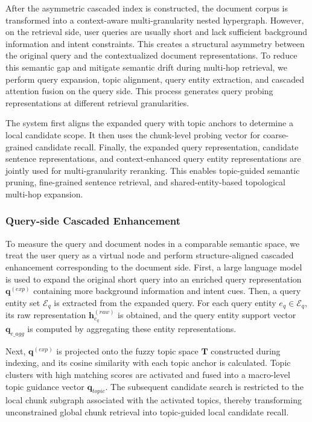\documentclass[preprint,12pt]{elsarticle}
\begin{document}
After the asymmetric cascaded index is constructed, the document corpus is transformed into a context-aware multi-granularity nested hypergraph. However, on the retrieval side, user queries are usually short and lack sufficient background information and intent constraints. This creates a structural asymmetry between the original query and the contextualized document representations. To reduce this semantic gap and mitigate semantic drift during multi-hop retrieval, we perform query expansion, topic alignment, query entity extraction, and cascaded attention fusion on the query side. This process generates query probing representations at different retrieval granularities.

The system first aligns the expanded query with topic anchors to determine a local candidate scope. It then uses the chunk-level probing vector for coarse-grained candidate recall. Finally, the expanded query representation, candidate sentence representations, and context-enhanced query entity representations are jointly used for multi-granularity reranking. This enables topic-guided semantic pruning, fine-grained sentence retrieval, and shared-entity-based topological multi-hop expansion.

\subsubsection{Query-side Cascaded Enhancement}

To measure the query and document nodes in a comparable semantic space, we treat the user query as a virtual node and perform structure-aligned cascaded enhancement corresponding to the document side. First, a large language model is used to expand the original short query into an enriched query representation $\mathbf{q}^{(exp)}$ containing more background information and intent cues. Then, a query entity set $\mathcal{E}_{q}$ is extracted from the expanded query. For each query entity $e_q \in \mathcal{E}_{q}$, its raw representation $\mathbf{h}_{e_q}^{(raw)}$ is obtained, and the query entity support vector $\mathbf{q}_{e\_agg}$ is computed by aggregating these entity representations.

Next, $\mathbf{q}^{(exp)}$ is projected onto the fuzzy topic space $\mathbf{T}$ constructed during indexing, and its cosine similarity with each topic anchor is calculated. Topic clusters with high matching scores are activated and fused into a macro-level topic guidance vector $\mathbf{q}_{topic}$. The subsequent candidate search is restricted to the local chunk subgraph associated with the activated topics, thereby transforming unconstrained global chunk retrieval into topic-guided local candidate recall.
\end{document}
